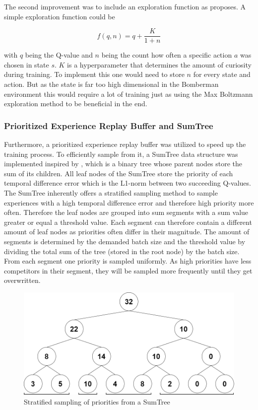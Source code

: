 The second improvement was to include an exploration function as \cite{Geron2018} proposes. A simple exploration function could be 

\begin{equation}
	f(q,n) = q + \frac{K}{1+n}
\end{equation}

with $q$ being the Q-value and $n$ being the count how often a specific action $a$ was chosen in state $s$. $K$ is a hyperparameter that determines the amount of curiosity during training. To implement this one would need to store $n$ for every state and action. But as the state is far too high dimensional in the Bomberman environment this would require a lot of training just as using the Max Boltzmann exploration method to be beneficial in the end. 

\subsubsection{Prioritized Experience Replay Buffer and SumTree}
\label{ch:approachBb}

Furthermore, a prioritized experience replay buffer was utilized to speed up the training process. To efficiently sample from it, a SumTree data structure was implemented inspired by \cite{Schaul2016}, which is a binary tree whose parent nodes store the sum of its children. All leaf nodes of the SumTree store the priority of each temporal difference error which is the L1-norm between two succeeding Q-values. The SumTree inherently offers a stratified sampling method to sample experiences with a high temporal difference error and therefore high priority more often. Therefore the leaf nodes are grouped into sum segments with a sum value greater or equal a threshold value. Each segment can therefore contain a different amount of leaf nodes as priorities often differ in their magnitude. The amount of segments is determined by the demanded batch size and the threshold value by dividing the total sum of the tree (stored in the root node) by the batch size. From each segment one priority is sampled uniformly. As high priorities have less competitors in their segment, they will be sampled more frequently until they get overwritten.  

\begin{figure}[ht]
	\centering
	\includegraphics[width=0.6\linewidth]{figures/sumtree.PNG}
	\caption{Stratified sampling of priorities from a SumTree}
	\label{fig:sumtree}
\end{figure}

